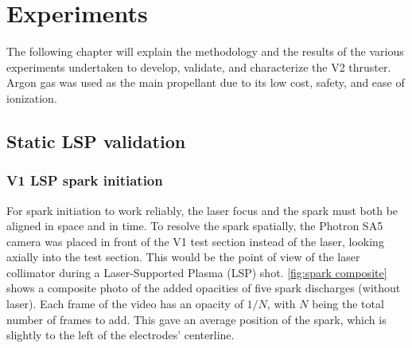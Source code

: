\setcounter{chapter}{2}
\chapter{Experiments}

    The following chapter will explain the methodology and the results of the various experiments undertaken to develop, validate, and characterize the V2 thruster. Argon gas was used as the main propellant due to its low cost, safety, and ease of ionization.

    \section{Static LSP validation}

        \subsection{V1 LSP spark initiation}

            For spark initiation to work reliably, the laser focus and the spark must both be aligned in space and in time. To resolve the spark spatially, the Photron SA5 camera was placed in front of the V1 test section instead of the laser, looking axially into the test section. This would be the point of view of the laser collimator during a Laser-Supported Plasma (LSP) shot. \autoref{fig:spark composite} shows a composite photo of the added opacities of five spark discharges (without laser). Each frame of the video has an opacity of $1/N$, with $N$ being the total number of frames to add. This gave an average position of the spark, which is slightly to the left of the electrodes' centerline.

